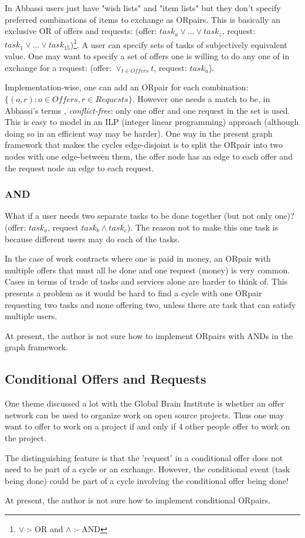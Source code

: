 \documentclass[main.tex]{subfiles}
\begin{document}
In Abbassi \cite{Abb1} \cite{Abb2} users just have "wish lists" and "item lists" but they don't specify preferred combinations of items to exchange as ORpairs. This is basically an exclusive OR of offers and requests: (offer: $task_a \vee \dots \vee task_z$, request: $task_1 \vee \dots \vee task_15$)\footnote{$\vee$ :- OR and $\wedge$ :- AND}. A user can specify sets of tasks of subjectively equivalent value. One may want to specify a set of offers one is willing to do any one of in exchange for a request: (offer: $\vee_{t \in Offers} t$, request: $task_a$).

Implementation-wise, one can add an ORpair for each combination: $\{(o,r) : o \in Offers,r \in Requests\}$. However one needs a match to be, in Abbassi's terms \cite{Abb1}, \textit{conflict-free}: only one offer and one request in the set is used. This is easy to model in an ILP (integer linear programming) approach (although doing so in an efficient way may be harder). One way in the present graph framework that makes the cycles edge-disjoint is to split the ORpair into two nodes with one edge-between them, the offer node has an edge to each offer and the request node an edge to each request.

\subsubsection{AND}
What if a user needs two separate tasks to be done together (but not only one)? (offer: $task_a$, request $task_b \wedge task_c$). The reason not to make this one task is because different users may do each of the tasks.

In the case of work contracts where one is paid in money, an ORpair with multiple offers that must all be done and one request (money) is very common. Cases in terms of trade of tasks and services alone are harder to think of. This presents a problem as it would be hard to find a cycle with one ORpair requesting two tasks and none offering two, unless there are task that can satisfy multiple users.

At present, the author is not sure how to implement ORpairs with ANDs in the graph framework.

\subsection{Conditional Offers and Requests}
One theme discussed a lot with the Global Brain Institute is whether an offer network can be used to organize work on open source projects. Thus one may want to offer to work on a project if and only if 4 other people offer to work on the project.

The distinguishing feature is that the 'request' in a conditional offer does not need to be part of a cycle or an exchange. However, the conditional event (task being done) could be part of a cycle involving the conditional offer being done!

At present, the author is not sure how to implement conditional ORpairs.
\end{document}
